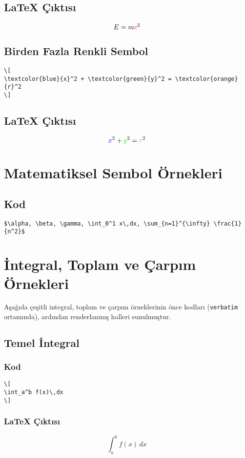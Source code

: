 \documentclass[a4paper,12pt]{article}
\begin{document}
\subsection{\LaTeX{} Çıktısı}
\[
E = m\textcolor{red}{c}^2
\]

\subsection{Birden Fazla Renkli Sembol}
\begin{verbatim}
\[
\textcolor{blue}{x}^2 + \textcolor{green}{y}^2 = \textcolor{orange}{r}^2
\]
\end{verbatim}

\subsection{\LaTeX{} Çıktısı}
\[
\textcolor{blue}{x}^2 + \textcolor{green}{y}^2 = \textcolor{orange}{r}^2
\]

\section{Matematiksel Sembol Örnekleri}
\subsection{Kod}
\begin{verbatim}
$\alpha, \beta, \gamma, \int_0^1 x\,dx, \sum_{n=1}^{\infty} \frac{1}{n^2}$
\end{verbatim}

\section{İntegral, Toplam ve Çarpım Örnekleri}

Aşağıda çeşitli integral, toplam ve çarpım örneklerinin önce kodları (\texttt{verbatim} ortamında), ardından renderlanmış halleri sunulmuştur.

\subsection{Temel İntegral}
\subsubsection{Kod}
\begin{verbatim}
\[
\int_a^b f(x)\,dx
\]
\end{verbatim}

\subsubsection{\LaTeX{} Çıktısı}
\[
\int_a^b f(x)\,dx
\]
\end{document}
